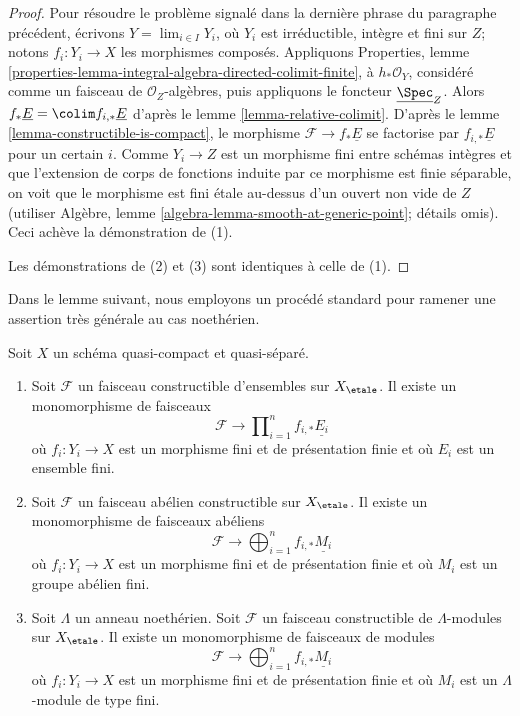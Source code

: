 \begin{proof}
\medskip\noindent
Pour résoudre le problème signalé dans la dernière phrase du paragraphe précédent,
écrivons $Y = \lim_{i \in I} Y_i$, où $Y_i$ est irréductible, intègre et
fini sur $Z$; notons $f_i : Y_i \to X$ les morphismes composés. Appliquons Properties, lemme
\ref{properties-lemma-integral-algebra-directed-colimit-finite},
à $h_*\mathcal{O}_Y$, considéré comme un faisceau de $\mathcal{O}_Z$-algèbres,
puis appliquons le foncteur $\underline{\Spec}_Z$.
Alors $f_*\underline{E} = \colim f_{i, *}\underline{E}$
d'après le lemme \ref{lemma-relative-colimit}.
D'après le lemme \ref{lemma-constructible-is-compact}, le morphisme
$\mathcal{F} \to f_*\underline{E}$
se factorise par $f_{i, *}\underline{E}$ pour un certain $i$.
Comme $Y_i \to Z$ est un morphisme fini entre schémas intègres
et que l'extension de corps de fonctions
induite par ce morphisme est finie séparable, on voit que le
morphisme est fini \'etale au-dessus d'un ouvert non vide de $Z$ (utiliser
Algèbre, lemme \ref{algebra-lemma-smooth-at-generic-point}; détails omis).
Ceci achève la démonstration de (1).

\medskip\noindent
Les démonstrations de (2) et (3) sont identiques à celle de (1).
\end{proof}

\noindent
Dans le lemme suivant, nous employons un procédé standard pour ramener une
assertion très générale au cas noethérien.

\begin{lemma}
\label{lemma-constructible-maps-into-constant-general}
\begin{reference}
\cite[Expos\'e IX, Proposition 2.14]{SGA4}
\end{reference}
Soit $X$ un schéma quasi-compact et quasi-séparé.
\begin{enumerate}
\item Soit $\mathcal{F}$ un faisceau constructible d'ensembles sur $X_\etale$.
Il existe un monomorphisme de faisceaux
$$
\mathcal{F} \longrightarrow
\prod\nolimits_{i = 1}^n f_{i, *}\underline{E_i}
$$
où $f_i : Y_i \to X$ est un morphisme fini et de présentation finie et où
$E_i$ est un ensemble fini.
\item Soit $\mathcal{F}$ un faisceau abélien constructible sur $X_\etale$.
Il existe un monomorphisme de faisceaux abéliens
$$
\mathcal{F} \longrightarrow
\bigoplus\nolimits_{i = 1}^n f_{i, *}\underline{M_i}
$$
où $f_i : Y_i \to X$ est un morphisme fini et de présentation finie et où
$M_i$ est un groupe abélien fini.
\item Soit $\Lambda$ un anneau noethérien.
Soit $\mathcal{F}$ un faisceau constructible de $\Lambda$-modules sur $X_\etale$.
Il existe un monomorphisme de faisceaux de modules
$$
\mathcal{F} \longrightarrow
\bigoplus\nolimits_{i = 1}^n f_{i, *}\underline{M_i}
$$
où $f_i : Y_i \to X$ est un morphisme fini et de présentation finie et où
$M_i$ est un $\Lambda$-module de type fini.
\end{enumerate}
\end{lemma}

